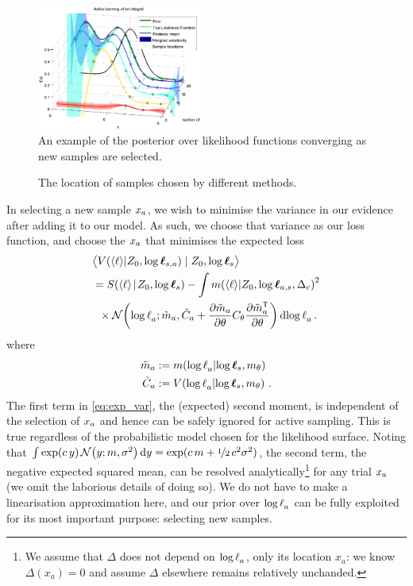 \documentclass{article}
\begin{document}
\begin{figure}
\centering
\includegraphics[width=0.48\textwidth]{figures/active_learning.eps}
\caption{An example of the posterior over likelihood functions converging as new samples are selected.}
\label{fig:active_learning}
\end{figure}

\begin{figure}
\centering
{}
\caption{The location of samples chosen by different methods.}
\label{fig:sample_paths}
\end{figure}

In selecting a new sample $\lfv_a$, we wish to minimise the variance in our evidence after adding it to our model. As such, we choose that variance as our loss function, and choose the $\lfv_a$ that minimises the expected loss
\begin{align}
&\bigl\langle \cov{\inty{\lfn}}{Z_0,\tvr_{s,a}}\mid Z_0,\tvr_{s}\bigr\rangle 
\nonumber\\
 & = \secm{\inty{\lfn}}{Z_0,\tvr_s} 
 - \int\mean{\inty{\lfn}}{Z_0,\tvr_{a,s},\Delta_c}^2\nonumber\\
& \hspace{0.2cm}
\times\N{\tr_a}
{\tilde{m}_a }
{\tilde{C}_a +\pderiv{\tilde{m}_a}{\theta}C_\theta\pderiv{\tilde{m}\tra_a}{\theta}}
\ud\tr_a\,.\label{eq:exp_var}
\end{align}
where
\begin{align*}
\tilde{m}_a & \deq \mean{\tr_a}{\tvr_s,m_\theta}\\
\tilde{C}_a & \deq \cov{\tr_a}{\tvr_s,m_\theta}\,.
\end{align*}
The first term in \eqref{eq:exp_var}, the (expected) second moment, is independent of the selection of $\lfv_a$ and hence can be safely ignored for active sampling. This is true regardless of the probabilistic model chosen for the likelihood surface. 
Noting that $\int \exp(c\, y)\, \N{y}{m}{\sigma^2} \ud y = \exp(c\, m + \nicefrac{1}{2}\, c^2 \sigma^2)$, 
the second term, the negative expected squared mean, can be resolved analytically\footnote{We assume that $\Delta$ does not depend on $\tr_a$, only its location $x_a$: we know $\Delta(x_a) = 0$ and assume $\Delta$ elsewhere remains relatively unchanded.}
 for any trial $\lfv_a$ (we omit the laborious details of doing so). We do not have to make a linearisation approximation here, and our prior over $\tr_a$ can be fully exploited for its most important purpose: selecting new samples. 
\end{document}
